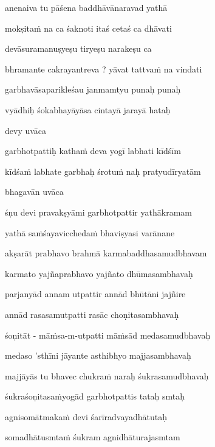 anenaiva tu pāśena baddhāvānaravad yathā\thinspace{\dandab} \dontdisplaylinenum

mokṣita\.m na ca śaknoti itaś cetaś ca dhāvati \veg\dontdisplaylinenum

devāsuramanuṣyeṣu tiryeṣu narakeṣu ca\thinspace{\dandab} \dontdisplaylinenum

bhramante cakrayantreva ? yāvat tattva\.m na vindati \veg\dontdisplaylinenum

garbhavāsaparikleśau janmamtyu punaḥ punaḥ\thinspace{\dandab} \dontdisplaylinenum

vyādhiḥ śokabhayāyāsa cintayā jarayā hataḥ \veg\dontdisplaylinenum

devy uvāca~{\dandab}\dontdisplaylinenum 

garbhotpattiḥ katha\.m deva yogī labhati kīdśīm\thinspace{\danda} \dontdisplaylinenum

kīdśa\.m labhate garbhaḥ śrotu\.m naḥ pratyudīryatām \veg\dontdisplaylinenum

bhagavān uvāca~{\dandab}\dontdisplaylinenum 

śṇu devi pravakṣyāmi garbhotpattir yathākramam\thinspace{\danda} \dontdisplaylinenum

yathā sa\.mśayaviccheda\.m bhaviṣyasi varānane \veg\dontdisplaylinenum

akṣarāt prabhavo brahmā karmabaddhasamudbhavam\thinspace{\dandab} \dontdisplaylinenum

karmato yajñaprabhavo yajñato dhūmasambhavaḥ \veg\dontdisplaylinenum

parjanyād annam utpattir annād bhūtāni jajñire\thinspace{\dandab} \dontdisplaylinenum

annād rasasamutpatti rasāc choṇitasambhavaḥ \veg\dontdisplaylinenum

śoṇitāt - mā\.msa-m-utpatti mā\.msād medasamudbhavaḥ\thinspace{\dandab} \dontdisplaylinenum

medaso 'sthīni jāyante asthibhyo majjasambhavaḥ \veg\dontdisplaylinenum

majjāyās tu bhavec chukra\.m naraḥ śukrasamudbhavaḥ\thinspace{\dandab} \dontdisplaylinenum

śukraśoṇitasa\.myogād garbhotpattis tataḥ smtaḥ \veg\dontdisplaylinenum

agnisomātmaka\.m devi śarīradvayadhātutaḥ\thinspace{\dandab} \dontdisplaylinenum

somadhātusmta\.m śukram agnidhāturajasmtam \danda\dontdisplaylinenum

